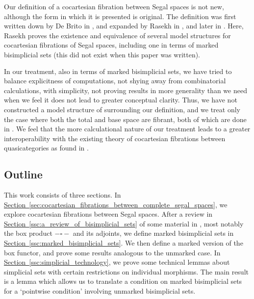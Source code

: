 \documentclass[main.tex]{subfiles}
\begin{document}
Our definition of a cocartesian fibration between Segal spaces is not new, although the form in which it is presented is original. The definition was first written down by De Brito in \cite{2016arXiv160500706B}, and expanded by Rasekh in \cite{rasekhcartesianfibrations}, and later in \cite{2021arXiv210205192R}. Here, Rasekh proves the existence and equivalence of several model structures for cocartesian fibrations of Segal spaces, including one in terms of marked bisimplicial sets (this did not exist when this paper was written). 

In our treatment, also in terms of marked bisimplicial sets, we have tried to balance explicitness of computations, not shying away from combinatorial calculations, with simplicity, not proving results in more generality than we need when we feel it does not lead to greater conceptual clarity. Thus, we have not constructed a model structure of surrounding our definition, and we treat only the case where both the total and base space are fibrant, both of which are done in \cite{2021arXiv210205192R}. We feel that the more calculational nature of our treatment leads to a greater interoperability with the existing theory of cocartesian fibrations between quasicategories as found in \cite{highertopostheory}.

\subsection{Outline}
\label{ssc:outline}

This work consists of three sections. In \hyperref[sec:cocartesian_fibrations_between_complete_segal_spaces]{Section~\ref*{sec:cocartesian_fibrations_between_complete_segal_spaces}}, we explore cocartesian fibrations between Segal spaces. After a review in \hyperref[ssc:a_review_of_bisimplicial_sets]{Section~\ref*{ssc:a_review_of_bisimplicial_sets}} of some material in \cite{qcats_vs_segal_spaces}, most notably the box product $- \square -$ and its adjoints, we define marked bisimplicial sets in \hyperref[ssc:marked_bisimplicial_sets]{Section~\ref*{ssc:marked_bisimplicial_sets}}. We then define a marked version of the box functor, and prove some results analogous to the unmarked case. In \hyperref[ssc:simplicial_technology]{Section~\ref*{ssc:simplicial_technology}}, we prove some technical lemmas about simplicial sets with certain restrictions on individual morphisms. The main result is a lemma which allows us to translate a condition on marked bisimplicial sets for a `pointwise condition' involving unmarked bisimplicial sets.
\end{document}

